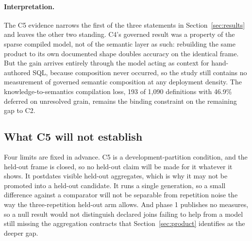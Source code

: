 \paragraph{Interpretation.}
The C5 evidence narrows the first of the three statements in
Section~\ref{sec:results} and leaves the other two standing. C4's governed
result was a property of the sparse compiled model, not of the semantic layer
as such: rebuilding the same product to its own documented shape doubles
accuracy on the identical frame. But the gain arrives entirely through the
model acting as context for hand-authored SQL, because composition never
occurred, so the study still contains no measurement of governed semantic
composition at any deployment density. The knowledge-to-semantics compilation
loss, 193 of 1{,}090 definitions with 46.9\% deferred on unresolved grain,
remains the binding constraint on the remaining gap to C2.

\subsection{What C5 will not establish}
Four limits are fixed in advance. C5 is a development-partition condition, and
the held-out frame is closed, so no held-out claim will be made for it whatever it
shows. It postdates visible held-out aggregates, which is why it may not be
promoted into a held-out candidate. It runs a single generation, so a small
difference against a comparator will not be separable from repetition noise the
way the three-repetition held-out arm allows. And phase 1 publishes no measures,
so a null result would not distinguish declared joins failing to help from a
model still missing the aggregation contracts that
Section~\ref{sec:product} identifies as the deeper gap.
